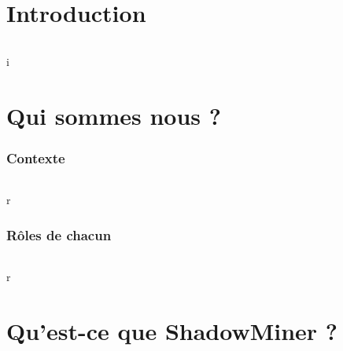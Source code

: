 \documentclass[titlepage, 13px, a4paper]{report}
\begin{document}
\AddToShipoutPicture*{\BackgroundPic}

\maketitle
\tableofcontents


\part{Introduction} 
\paragraph{} \hspace{0pt} 
i



\newpage


\part{Qui sommes nous ?}
\section{Contexte}
\paragraph{} \hspace{0pt}
r

\section{Rôles de chacun}
\paragraph{} \hspace{0pt}
r




\newpage


\part{Qu'est-ce que ShadowMiner ?}
\end{document}
